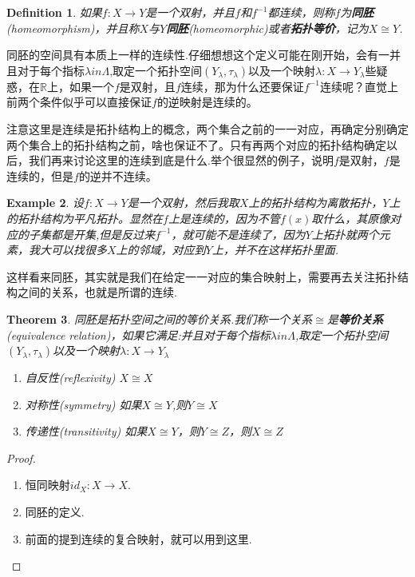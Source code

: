 \documentclass{article}
\newtheorem{theorem}{Theorem}[section]
\newtheorem{example}[theorem]{Example}
\newtheorem{definition}[theorem]{Definition}
\newcommand*{\xfunc}[4]{{#2}\colon{#3}{#1}{#4}}
\newcommand*{\func}[3]{\xfunc{\to}{#1}{#2}{#3}}
\begin{document}
\begin{definition}
如果$\func{f}{X}{Y}$是一个双射，并且$f$和$f^{-1}$都连续，则称$f$为\textbf{同胚}(homeomorphism)，并且称$X$与$Y$\textbf{同胚}(homeomorphic)或者\textbf{拓扑等价}，记为$X \cong Y$.
\end{definition}

同胚的空间具有本质上一样的连续性.仔细想想这个定义可能在刚开始，会有一并且对于每个指标$\lambda in \Lambda$,取定一个拓扑空间$(Y_\lambda,\tau_\lambda)$以及一个映射$\func{\lambda}{X}{Y_\lambda}$些疑惑，在$\mathbb{R}$上，如果一个$f$是双射，且$f$连续，那为什么还要保证$f^{-1}$连续呢？直觉上前两个条件似乎可以直接保证$f$的逆映射是连续的。

注意这里是连续是拓扑结构上的概念，两个集合之前的一一对应，再确定分别确定两个集合上的拓扑结构之前，啥也保证不了。只有再两个对应的拓扑结构确定以后，我们再来讨论这里的连续到底是什么.举个很显然的例子，说明$f$是双射，$f$是连续的，但是$f$的逆并不连续。

\begin{example}
设$\func{f}{X}{Y}$是一个双射，然后我取$X$上的拓扑结构为离散拓扑，$Y$上的拓扑结构为平凡拓扑。显然在$f$上是连续的，因为不管$f(x)$取什么，其原像对应的子集都是开集,但是反过来$f^{-1}$，就可能不是连续了，因为$Y$上拓扑就两个元素，我大可以找很多$X$上的邻域，对应到$Y$上，并不在这样拓扑里面.
\end{example}

这样看来同胚，其实就是我们在给定一一对应的集合映射上，需要再去关注拓扑结构之间的关系，也就是所谓的连续.

\begin{theorem}
同胚是拓扑空间之间的等价关系.我们称一个关系$\cong$是\textbf{等价关系}(equivalence relation)，如果它满足:并且对于每个指标$\lambda in \Lambda$,取定一个拓扑空间$(Y_\lambda,\tau_\lambda)$以及一个映射$\func{\lambda}{X}{Y_\lambda}$
\begin{enumerate}
	\item 自反性(reflexivity) $X \cong X$
	\item 对称性(symmetry) 如果$X \cong Y$,则$Y \cong X$ 
	\item 传递性(transitivity) 如果$X \cong Y$，则$Y \cong Z$，则$X \cong Z$
\end{enumerate}
\end{theorem}

\begin{proof}
\begin{enumerate}
	\item 恒同映射$\func{id_X}{X}{X}$.
	\item 同胚的定义.
	\item 前面的提到连续的复合映射，就可以用到这里.
\end{enumerate}
\end{proof}
\end{document}

